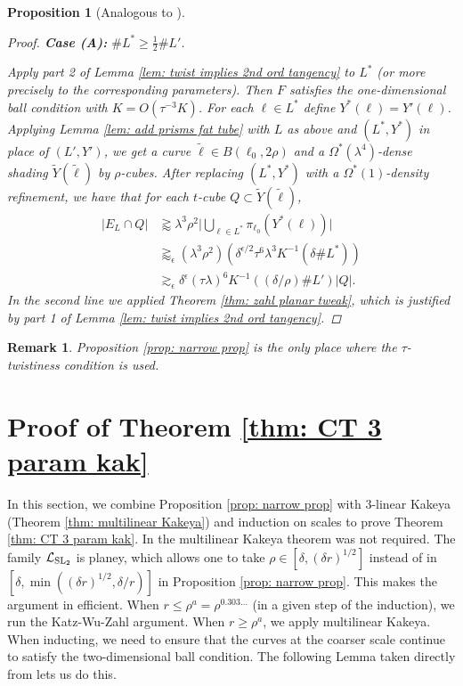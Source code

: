 \documentclass[12pt]{amsart}
\numberwithin{equation}{section}
\newtheorem{proposition}[lemma]{Proposition}
\newtheorem{remark}[lemma]{Remark}
\newcommand{\1}{\mathbbm{1}}
\begin{document}
\begin{proposition}[Analogous to ]
\begin{proof}
        \noindent \textbf{Case (A):} $\# L^* \geq \frac{1}{2} \# L'$.

        Apply part 2 of Lemma \ref{lem: twist implies 2nd ord tangency} to $L^*$ (or more precisely to the corresponding parameters). Then $F$ satisfies the one-dimensional ball condition with $K = O(\tau^{-3} K)$. For each $\ell \in L^*$ define $Y^*(\ell) = Y'(\ell)$. Applying Lemma \ref{lem: add prisms fat tube} with $L$ as above and $(L^*, Y^*)$ in place of $(L',Y')$, we get a curve $\tilde \ell \in B(\ell_0, 2\rho)$ and a $\Omega^*(\lambda^4)$-dense shading $\tilde Y(\tilde \ell)$ by $\rho$-cubes. After replacing $(L^*, Y^*)$ with a $\Omega^*(1)$-density refinement, we have that for each $t$-cube $Q \subset \tilde Y(\tilde \ell)$, 
        \begin{align}
            |E_L \cap Q| &\gtrapprox \lambda^3 \rho^2 \Big | \bigcup_{\ell \in L^*} \pi_{\ell_0}(Y^*(\ell))\Big | \\
            &\gtrapprox_\epsilon (\lambda^3 \rho^2) (\delta^{\epsilon/2} \tau^6 \lambda^3 K^{-1} (\delta \#L^*)) \\
            &\gtrsim_\epsilon \delta^{\epsilon} (\tau \lambda)^6 K^{-1} ((\delta / \rho) \# L') |Q|.
        \end{align}
        In the second line we applied Theorem \ref{thm: zahl planar tweak}, which is justified by part 1 of Lemma \ref{lem: twist implies 2nd ord tangency}.
    \end{proof}
\end{proposition}

\begin{remark}
    Proposition \ref{prop: narrow prop} is the only place where the $\tau$-twistiness condition is used. 
\end{remark}


\section{Proof of Theorem \ref{thm: CT 3 param kak}}\label{sec: 6}

In this section, we combine Proposition \ref{prop: narrow prop} with 3-linear Kakeya (Theorem \ref{thm: multilinear Kakeya}) and induction on scales to prove Theorem \ref{thm: CT 3 param kak}. 
In \cite{KWZ} the multilinear Kakeya theorem was not required. The family $\mathcal L_{\rm{SL}_2}$ is planey, which allows one to take $\rho \in [\delta, (\delta r)^{1/2}]$ instead of in $[\delta, \min((\delta r)^{1/2}, \delta/r)]$ in Proposition \ref{prop: narrow prop}. This makes the argument in \cite{KWZ} efficient. When $r \leq \rho^{a} = \rho^{0.303 \ldots}$ (in a given step of the induction), we run the Katz-Wu-Zahl argument. When $r \geq \rho^{a}$, we apply multilinear Kakeya. When inducting, we need to ensure that the curves at the coarser scale continue to satisfy the two-dimensional ball condition. The following Lemma taken directly from \cite{KWZ} lets us do this. 
\end{document}
